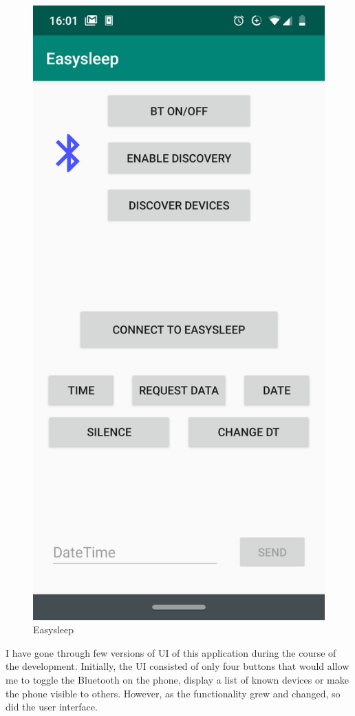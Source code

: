 \documentclass[12pt,a4paper]{article}
\begin{document}
    \begin{figure}
        \centering
        \includegraphics[scale=0.1]{easysleep_app.png}
        \caption[Easysleep Application]{Easysleep}
    \end{figure}
    I have gone through few versions of UI of this application during the course of the development. Initially, the UI consisted of only four buttons that would allow me to toggle the Bluetooth on the phone, display a list of known devices or make the phone visible to others. However, as the functionality grew and changed, so did the user interface.\\
    
\end{document}
